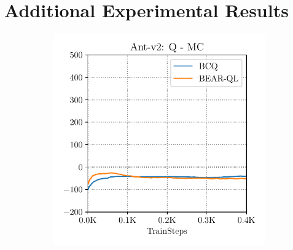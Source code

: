 \section{Additional Experimental Results}
\label{exp:additional_results}

\label{app:q_vs_mc}
\begin{figure}[h]
    \centering
    \begin{subfigure}[h]{0.31\textwidth}
        \centering
        \includegraphics[width=0.99\linewidth]{chapters/bear/images/ant_q_vs_mc_1.pdf}
    \end{subfigure}%
    ~
    \begin{subfigure}[h]{0.31\textwidth}
        \centering

\end{subfigure}
\end{figure}
